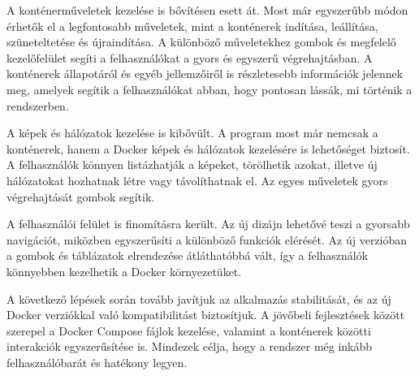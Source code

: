 A konténerműveletek kezelése is bővítésen esett át. Most már egyszerűbb módon érhetők el a legfontosabb műveletek, mint a konténerek indítása, leállítása, szüneteltetése és újraindítása. A különböző műveletekhez gombok és megfelelő kezelőfelület segíti a felhasználókat a gyors és egyszerű végrehajtásban. A konténerek állapotáról és egyéb jellemzőiről is részletesebb információk jelennek meg, amelyek segítik a felhasználókat abban, hogy pontosan lássák, mi történik a rendszerben.

A képek és hálózatok kezelése is kibővült. A program most már nemcsak a konténerek, hanem a Docker képek és hálózatok kezelésére is lehetőséget biztosít. A felhasználók könnyen listázhatják a képeket, törölhetik azokat, illetve új hálózatokat hozhatnak létre vagy távolíthatnak el. Az egyes műveletek gyors végrehajtását gombok segítik.

A felhasználói felület is finomításra került. Az új dizájn lehetővé teszi a gyorsabb navigációt, miközben egyszerűsíti a különböző funkciók elérését. Az új verzióban a gombok és táblázatok elrendezése átláthatóbbá vált, így a felhasználók könnyebben kezelhetik a Docker környezetüket.

A következő lépések során tovább javítjuk az alkalmazás stabilitását, és az új Docker verziókkal való kompatibilitást biztosítjuk. A jövőbeli fejlesztések között szerepel a Docker Compose fájlok kezelése, valamint a konténerek közötti interakciók egyszerűsítése is. Mindezek célja, hogy a rendszer még inkább felhasználóbarát és hatékony legyen.


